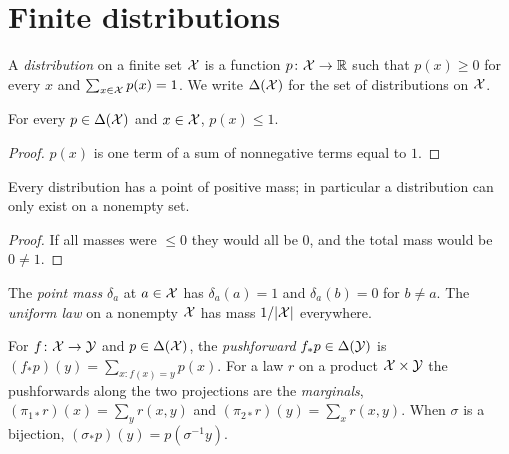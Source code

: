 \chapter{Finite distributions}
\label{chap:distributions}

\begin{definition}[Distribution]
  \label{def:dist}
  \leanok
  A \emph{distribution} on a finite set $\mathcal X$ is a function $p \colon \mathcal X \to \mathbb R$ such
  that $p(x) \ge 0$ for every $x$ and $\sum_{x \in \mathcal X} p(x) = 1$.  We write $\Delta(\mathcal X)$ for
  the set of distributions on $\mathcal X$.
\end{definition}

\begin{lemma}
  \label{lem:dist_le_one}
  \leanok
  For every $p \in \Delta(\mathcal X)$ and $x \in \mathcal X$, $p(x) \le 1$.
\end{lemma}
\begin{proof}
  \leanok
  $p(x)$ is one term of a sum of nonnegative terms equal to $1$.
\end{proof}

\begin{lemma}
  \label{lem:dist_exists_pos}
  \leanok
  Every distribution has a point of positive mass; in particular a distribution can only exist
  on a nonempty set.
\end{lemma}
\begin{proof}
  \leanok
  If all masses were $\le 0$ they would all be $0$, and the total mass would be $0 \ne 1$.
\end{proof}

\begin{definition}
  \label{def:pure_uniform}
  \leanok
  The \emph{point mass} $\delta_a$ at $a \in \mathcal X$ has $\delta_a(a) = 1$ and $\delta_a(b) = 0$
  for $b \ne a$.  The \emph{uniform law} on a nonempty $\mathcal X$ has mass $1/|\mathcal X|$ everywhere.
\end{definition}

\begin{definition}[Pushforward]
  \label{def:map}
  \leanok
  For $f \colon \mathcal X \to \mathcal Y$ and $p \in \Delta(\mathcal X)$, the \emph{pushforward} $f_* p \in \Delta(\mathcal Y)$ is
  $(f_* p)(y) = \sum_{x : f(x) = y} p(x)$.  For a law $r$ on a product $\mathcal X \times \mathcal Y$ the
  pushforwards along the two projections are the \emph{marginals},
  $(\pi_{1*} r)(x) = \sum_y r(x, y)$ and $(\pi_{2*} r)(y) = \sum_x r(x, y)$.  When $\sigma$ is a
  bijection, $(\sigma_* p)(y) = p(\sigma^{-1} y)$.
\end{definition}

